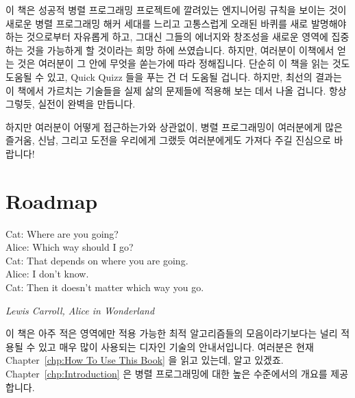 이 책은 성공적 병렬 프로그래밍 프로젝트에 깔려있는 엔지니어링 규칙을 보이는
것이 새로운 병렬 프로그래밍 해커 세대를 느리고 고통스럽게 오래된 바퀴를 새로
발명해야 하는 것으로부터 자유롭게 하고, 그대신 그들의 에너지와 창조성을 새로운
영역에 집중하는 것을 가능하게 할 것이라는 희망 하에 쓰였습니다.
하지만, 여러분이 이책에서 얻는 것은 여러분이 그 안에 무엇을 쏟는가에 따라
정해집니다.
단순히 이 책을 읽는 것도 도움될 수 있고, Quick Quizz 들을 푸는 건 더 도움될
겁니다.
하지만, 최선의 결과는 이 책에서 가르치는 기술들을 실제 삶의 문제들에 적용해
보는 데서 나올 겁니다.
항상 그렇듯, 실전이 완벽을 만듭니다.

\iffalse

This book is written in the hope that presenting the engineering
discipline underlying successful
parallel-programming projects will free a new generation of parallel hackers
from the need to slowly and painstakingly reinvent old wheels, enabling
them to instead focus their energy and creativity on new frontiers.
However, what you get from this book will be determined by what you
put into it.
It is hoped that simply reading this book will be helpful,
and that working the Quick Quizzes will be even more helpful.
However, the best results come from applying the techniques taught
in this book to real-life problems.
As always, practice makes perfect.

\fi

하지만 여러분이 어떻게 접근하는가와 상관없이, 병렬 프로그래밍이 여러분에게 많은
즐거움, 신남, 그리고 도전을 우리에게 그랬듯 여러분에게도 가져다 주길 진심으로
바랍니다!

\iffalse

But no matter how you approach it, we sincerely hope that parallel
programming brings you at least as much fun, excitement, and challenge
that it has brought to us!

\fi

\section{Roadmap}
\label{sec:howto:Roadmap}
%
\epigraph{Cat: Where are you going? \\
	  Alice: Which way should I go? \\
	  Cat: That depends on where you are going. \\
	  Alice: I don't know. \\
	  Cat: Then it doesn't matter which way you go.}
	 {\emph{Lewis Carroll, Alice in Wonderland}}

이 책은 아주 적은 영역에만 적용 가능한 최적 알고리즘들의 모음이라기보다는 널리
적용될 수 있고 매우 많이 사용되는 디자인 기술의 안내서입니다.
여러분은 현재 Chapter~\ref{chp:How To Use This Book} 을 읽고 있는데, 알고
있겠죠.
Chapter~\ref{chp:Introduction} 은 병렬 프로그래밍에 대한 높은 수준에서의 개요를
제공합니다.

